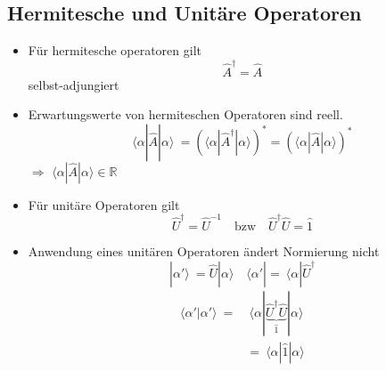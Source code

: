 \documentclass[10pt,article,colorback,accentcolor=tud9d]{scrartcl}
\begin{document}
\begin{fleqn}
\subsection{Hermitesche und Unitäre Operatoren}
\begin{itemize}
  \item Für hermitesche operatoren gilt
    \begin{equation}
    \hat{A}^{\dagger}=\hat{A}
    \end{equation}
    selbst-adjungiert
  \item Erwartungswerte von hermiteschen Operatoren sind reell.
    \begin{equation}
    \langle \alpha\left.\right|\hat{A}\left.\right|\alpha\rangle  \ =  \left(\langle \alpha \left.\right| \hat{A}^{\dagger} \left.\right| \alpha \rangle \right)^* = \left(\langle \alpha \left.\right|\hat{A}\left.\right|\alpha\rangle \right)^*
    \end{equation}
    $\Rightarrow$ $\langle \alpha\left.\right|\hat{A}\left.\right|\alpha\rangle  \in \mathbb{R}$
  \item Für unitäre Operatoren gilt
    \begin{equation}
    \hat{U}^{\dagger}=\hat{U}^{-1} \quad \text{bzw} \quad \hat{U}^{\dagger}\hat{U}=\hat{1}
    \end{equation}
  \item Anwendung eines unitären Operatoren ändert Normierung nicht
    \begin{equation} \nonumber
     \left.\right|\alpha'\rangle  \ = \hat{U}\left.\right|\alpha\rangle  \quad \langle \alpha'\left.\right|= \ \langle \alpha\left.\right|\hat{U}^{\dagger}
    \end{equation}
    \begin{equation}
    \begin{aligned}
    \langle \alpha'\left.\right|\alpha'\rangle  \ =& \ \langle \alpha\left.\right|\underbrace{\hat{U}^{\dagger}\hat{U}}_{\hat{1}}\left.\right|\alpha\rangle \\
    &= \ \langle \alpha\left.\right|\hat{1}\left.\right|\alpha\rangle 
    \end{aligned}
    \end{equation}
    \end{itemize}

\end{fleqn}
\end{document}
